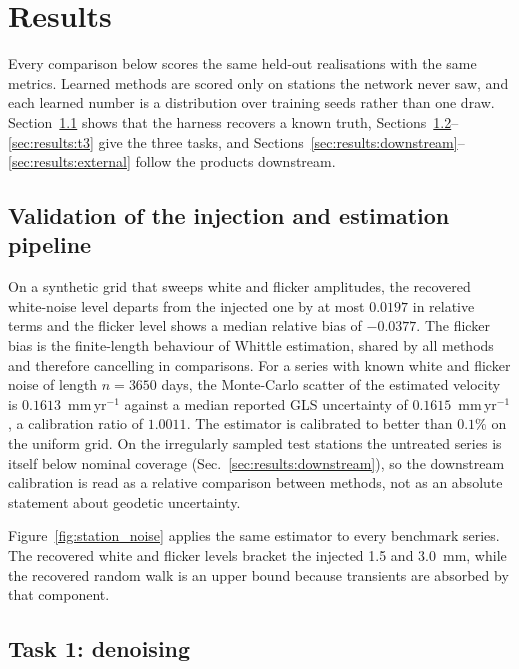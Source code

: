 \section{Results}
\label{sec:results}

Every comparison below scores the same held-out realisations with the same
metrics. Learned methods are scored only on stations the network never saw, and
each learned number is a distribution over training seeds rather than one draw.
Section~\ref{sec:results:check} shows that the harness recovers a known truth,
Sections~\ref{sec:results:t1}--\ref{sec:results:t3} give the three tasks, and
Sections~\ref{sec:results:downstream}--\ref{sec:results:external} follow the
products downstream.

\subsection{Validation of the injection and estimation pipeline}
\label{sec:results:check}

On a synthetic grid that sweeps white and flicker amplitudes, the recovered
white-noise level departs from the injected one by at most $0.0197$ in relative
terms and the flicker level shows a median relative bias of $-0.0377$. The
flicker bias is the finite-length behaviour of Whittle estimation, shared by
all methods and therefore cancelling in comparisons. For a series with known
white and flicker noise of length $n=3650$ days, the Monte-Carlo scatter of the
estimated velocity is $0.1613$~mm\,yr$^{-1}$ against a median reported GLS
uncertainty of $0.1615$~mm\,yr$^{-1}$, a calibration ratio of $1.0011$. The
estimator is calibrated to better than $0.1\%$ on the uniform grid. On the
irregularly sampled test stations the untreated series is itself below nominal
coverage (Sec.~\ref{sec:results:downstream}), so the downstream calibration is
read as a relative comparison between methods, not as an absolute statement
about geodetic uncertainty.

Figure~\ref{fig:station_noise} applies the same estimator to every benchmark
series. The recovered white and flicker levels bracket the injected 1.5 and
3.0~mm, while the recovered random walk is an upper bound because transients are
absorbed by that component.

\subsection{Task 1: denoising}
\label{sec:results:t1}

